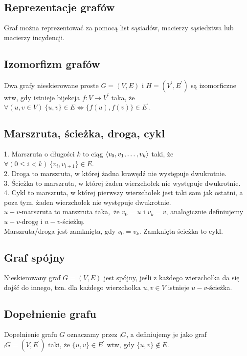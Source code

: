 \subsection*{Reprezentacje grafów}
Graf można reprezentować za pomocą list sąsiadów, macierzy sąsiedztwa lub macierzy
incydencji.

\subsection*{Izomorfizm grafów}
Dwa grafy nieskierowane proste $G = (V, E)$ i $H = (V^\prime, E^\prime)$ są
izomorficzne wtw, gdy istnieje bijekcja $f: V \to V^\prime$ taka, że
$\forall(u, v \in V) \ \{ u,v \} \in E \Leftrightarrow \{ f(u), f(v) \} \in E^\prime$.

\subsection*{Marszruta, ścieżka, droga, cykl}
1. Marszruta o długości $k$ to ciąg $\left\langle v_0, v_1, \ldots, v_k \right\rangle$ taki, że \\
$\forall(0 \leq i < k) \ \{ v_i, v_{i+1} \} \in E$. \\
2. Droga to marszruta, w której żadna krawędź nie występuje dwukrotnie. \\
3. Ścieżka to marszruta, w której żaden wierzchołek nie występuje dwukrotnie. \\
4. Cykl to marszruta, w której pierwszy wierzchołek jest taki sam jak ostatni,
a poza tym, żaden wierzchołek nie występuje dwukrotnie.\\
$u-v$-marszruta to marszruta taka, że $v_0 = u$ i $v_k = v$, analogicznie 
definiujemy $u-v$-drogę i $u-v$-ścieżkę. \\
Marszruta/droga jest zamknięta, gdy $v_0 = v_k$. Zamknięta ścieżka to cykl.

\subsection*{Graf spójny}
Nieskierowany graf $G = (V, E)$ jest spójny, jeśli z każdego wierzchołka da się
dojść do innego, tzn. dla każdego wierzchołka $u,v \in V$ istnieje $u-v$-ścieżka.

\subsection*{Dopełnienie grafu}
Dopełnienie grafu $G$ oznaczamy przez $\comp{G}$, a definiujemy je jako graf
$\comp{G} = (V, E^\prime)$ taki, że $\{ u,v \} \in E^\prime$ wtw, gdy
$\{ u,v \} \notin E$.

